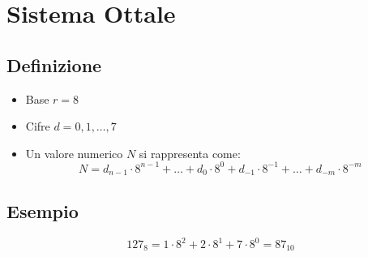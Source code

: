 \section{Sistema Ottale}
\subsection{Definizione}
\begin{itemize}
    \item Base $r=8$
    \item Cifre $d=0,1,\dots,7$
    \item Un valore numerico $N$ si rappresenta come:
    {\large
        $$
            N = d_{n-1} \cdot 8^{n-1} + \dots + d_0 \cdot 8^0 + d_{-1} \cdot 8^{-1} + \dots + d_{-m} \cdot 8^{-m}
        $$
    }
\end{itemize}

\subsection{Esempio}
{
    \Large
    $$
        127_8 = 1 \cdot 8^2 + 2 \cdot 8^1 + 7 \cdot 8^0 = 87_{10}
    $$
}
